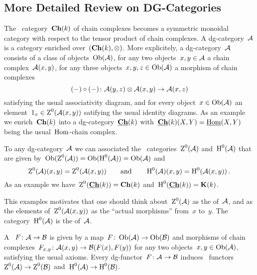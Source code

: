 \documentclass[a4paper,10pt]{scrartcl}
\begin{document}
\subsection{More Detailed Review on DG-Categories}
\label{detailed dg review}

The~{\klinear} category~$\mathbf{Ch}(k)$ of chain complexes becomes a symmetric monoidal category with respect to the tensor product of chain complexes.
A dg-category~$\mathcal{A}$ is a category enriched over~$(\mathbf{Ch}(k), \otimes)$.
More explicitely, a dg-category~$\mathcal{A}$ consists of a class of objects~$\operatorname{Ob}(\mathcal{A})$, for any two objects~$x, y \in \mathcal{A}$ a chain complex~$\mathcal{A}(x,y)$, for any three objects~$x, y, z \in \operatorname{Ob}(\mathcal{A})$ a morphism of chain complexes
\[
  (-) \circ (-)
  \colon
  \mathcal{A}(y,z) \otimes \mathcal{A}(x,y)
  \to
  \mathcal{A}(x,z)
\]
satisfying the usual associativity diagram, and for every object~$x \in \operatorname{Ob}(\mathcal{A})$ an element~$1_x \in \operatorname{Z}^0(\mathcal{A}(x,y))$ satifying the usual identity diagrams.
As an example we enrich~$\mathbf{Ch}(k)$ into a dg-category~$\underline{\mathbf{Ch}}(k)$ with~$\underline{\mathbf{Ch}}(k)(X,Y) = \underline{\operatorname{Hom}}(X,Y)$ being the usual~$\operatorname{Hom}$-chain complex.

To any dg-category~$\mathcal{A}$ we can associated the~{\klinear} categories~$\operatorname{Z}^0(\mathcal{A})$ and~$\operatorname{H}^0(\mathcal{A})$ that are given by~$\operatorname{Ob}(\operatorname{Z}^0(\mathcal{A})) = \operatorname{Ob}(\operatorname{H}^0(\mathcal{A})) = \operatorname{Ob}(\mathcal{A})$ and
\[
  \operatorname{Z}^0(\mathcal{A})(x,y)
  =
  \operatorname{Z}^0(\mathcal{A}(x,y))
  \qquad\text{and}\qquad
  \operatorname{H}^0(\mathcal{A})(x,y)
  =
  \operatorname{H}^0(\mathcal{A}(x,y)) \,.
\]
As an example we have~$\operatorname{Z}^0(\underline{\mathbf{Ch}}(k)) = \mathbf{Ch}(k)$ and~$\operatorname{H}^0(\underline{\mathbf{Ch}}(k)) = \mathbf{K}(k)$.

This examples motivates that one should think about~$\operatorname{Z}^0(\mathcal{A})$ as the  of~$\mathcal{A}$, and as the elements of~$\operatorname{Z}^0(\mathcal{A}(x,y))$ as the \enquote{actual morphisms} from~$x$ to~$y$.
The category~$\operatorname{H}^0(\mathcal{A})$ is the  of~$\mathcal{A}$.

A ~$F \colon \mathcal{A} \to \mathcal{B}$ is given by a map~$F \colon \operatorname{Ob}(\mathcal{A}) \to \operatorname{Ob}(\mathcal{B})$ and morphisms of chain complexes~$F_{x,y} \colon \mathcal{A}(x,y) \to \mathcal{B}(F(x), F(y))$ for any two objects~$x, y \in \operatorname{Ob}(\mathcal{A})$, satisfying the usual axioms.
Every dg-functor~$F \colon \mathcal{A} \to \mathcal{B}$ induces~{\klinear} functors~$\operatorname{Z}^0(\mathcal{A}) \to \operatorname{Z}^0(\mathcal{B})$ and~$\operatorname{H}^0(\mathcal{A}) \to \operatorname{H}^0(\mathcal{B})$.
\end{document}
